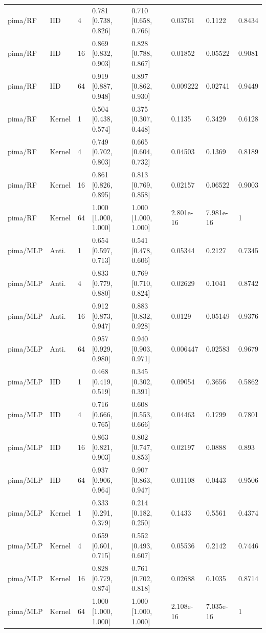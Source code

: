 \begin{tabular}{llllllll}
pima/RF & IID & 4 & 0.781 [0.738, 0.826] & 0.710 [0.658, 0.766] & 0.03761 & 0.1122 & 0.8434 \\
pima/RF & IID & 16 & 0.869 [0.832, 0.903] & 0.828 [0.788, 0.867] & 0.01852 & 0.05522 & 0.9081 \\
pima/RF & IID & 64 & 0.919 [0.887, 0.948] & 0.897 [0.862, 0.930] & 0.009222 & 0.02741 & 0.9449 \\
pima/RF & Kernel & 1 & 0.504 [0.438, 0.574] & 0.375 [0.307, 0.448] & 0.1135 & 0.3429 & 0.6128 \\
pima/RF & Kernel & 4 & 0.749 [0.702, 0.803] & 0.665 [0.604, 0.732] & 0.04503 & 0.1369 & 0.8189 \\
pima/RF & Kernel & 16 & 0.861 [0.826, 0.895] & 0.813 [0.769, 0.858] & 0.02157 & 0.06522 & 0.9003 \\
pima/RF & Kernel & 64 & 1.000 [1.000, 1.000] & 1.000 [1.000, 1.000] & 2.801e-16 & 7.981e-16 & 1 \\
pima/MLP & Anti. & 1 & 0.654 [0.597, 0.713] & 0.541 [0.478, 0.606] & 0.05344 & 0.2127 & 0.7345 \\
pima/MLP & Anti. & 4 & 0.833 [0.779, 0.880] & 0.769 [0.710, 0.824] & 0.02629 & 0.1041 & 0.8742 \\
pima/MLP & Anti. & 16 & 0.912 [0.873, 0.947] & 0.883 [0.832, 0.928] & 0.0129 & 0.05149 & 0.9376 \\
pima/MLP & Anti. & 64 & 0.957 [0.929, 0.980] & 0.940 [0.903, 0.971] & 0.006447 & 0.02583 & 0.9679 \\
pima/MLP & IID & 1 & 0.468 [0.419, 0.519] & 0.345 [0.302, 0.391] & 0.09054 & 0.3656 & 0.5862 \\
pima/MLP & IID & 4 & 0.716 [0.666, 0.765] & 0.608 [0.553, 0.666] & 0.04463 & 0.1799 & 0.7801 \\
pima/MLP & IID & 16 & 0.863 [0.821, 0.903] & 0.802 [0.747, 0.853] & 0.02197 & 0.0888 & 0.893 \\
pima/MLP & IID & 64 & 0.937 [0.906, 0.964] & 0.907 [0.863, 0.947] & 0.01108 & 0.0443 & 0.9506 \\
pima/MLP & Kernel & 1 & 0.333 [0.291, 0.379] & 0.214 [0.182, 0.250] & 0.1433 & 0.5561 & 0.4374 \\
pima/MLP & Kernel & 4 & 0.659 [0.601, 0.715] & 0.552 [0.493, 0.607] & 0.05536 & 0.2142 & 0.7446 \\
pima/MLP & Kernel & 16 & 0.828 [0.779, 0.874] & 0.761 [0.702, 0.818] & 0.02688 & 0.1035 & 0.8714 \\
pima/MLP & Kernel & 64 & 1.000 [1.000, 1.000] & 1.000 [1.000, 1.000] & 2.108e-16 & 7.035e-16 & 1 \\
\bottomrule
\end{tabular}

